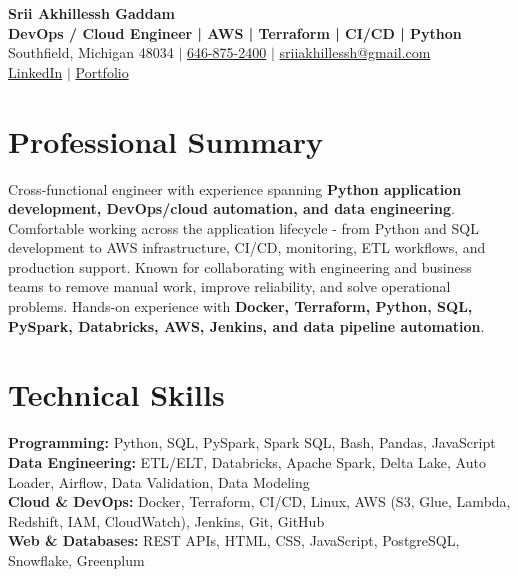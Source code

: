 \documentclass[letterpaper,10pt]{article}
\begin{document}
\fontsize{9.35pt}{10.45pt}\selectfont

\begin{center}
    {\LARGE \textbf{Srii Akhillessh Gaddam}} \\[-1pt]
    \textbf{DevOps / Cloud Engineer | AWS | Terraform | CI/CD | Python} \\[2pt]
    Southfield, Michigan 48034 $|$
    \href{tel:6468752400}{646-875-2400} $|$
    \href{mailto:sriiakhillessh@gmail.com}{sriiakhillessh@gmail.com} \\[1pt]
    \href{https://www.linkedin.com/in/srii-akhiilessh-gaddam-b48668191/}{LinkedIn} $|$
    \href{https://sriiakhillesshg.github.io/portfolio/}{Portfolio}
\end{center}
\vspace{-8pt}

\section{Professional Summary}
\small{Cross-functional engineer with experience spanning \textbf{Python application development, DevOps/cloud automation, and data engineering}. Comfortable working across the application lifecycle - from Python and SQL development to AWS infrastructure, CI/CD, monitoring, ETL workflows, and production support. Known for collaborating with engineering and business teams to remove manual work, improve reliability, and solve operational problems. Hands-on experience with \textbf{Docker, Terraform, Python, SQL, PySpark, Databricks, AWS, Jenkins, and data pipeline automation}.}

\section{Technical Skills}
\small{
\textbf{Programming:} Python, SQL, PySpark, Spark SQL, Bash, Pandas, JavaScript \\
\textbf{Data Engineering:} ETL/ELT, Databricks, Apache Spark, Delta Lake, Auto Loader, Airflow, Data Validation, Data Modeling \\
\textbf{Cloud \& DevOps:} Docker, Terraform, CI/CD, Linux, AWS (S3, Glue, Lambda, Redshift, IAM, CloudWatch), Jenkins, Git, GitHub \\
\textbf{Web \& Databases:} REST APIs, HTML, CSS, JavaScript, PostgreSQL, Snowflake, Greenplum
}
\end{document}
